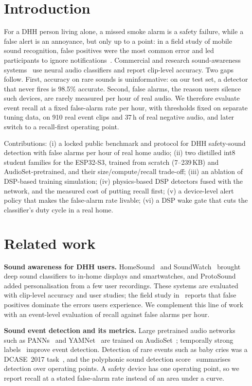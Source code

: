 \documentclass[conference]{IEEEtran}
\begin{document}
\section{Introduction}
For a DHH person living alone, a missed smoke alarm is a safety failure, while a false alert is
an annoyance, but only up to a point: in a field study of mobile sound recognition, false
positives were the most common error and led participants to ignore
notifications~\cite{notthereyet}. Commercial and research sound-awareness
systems~\cite{homesound,soundwatch,protosound} use neural audio classifiers and report
clip-level accuracy. Two gaps follow. First, accuracy on
rare sounds is uninformative: on our test set, a detector that never fires is 98.5\% accurate.
Second, false alarms, the reason users silence such devices, are rarely measured per hour of
real audio. We therefore evaluate event recall at a fixed false-alarm rate per hour, with
thresholds fixed on separate tuning data, on 910 real event clips and 37\,h of real negative
audio, and later switch to a recall-first operating point.

Contributions: (i) a locked public benchmark and protocol for DHH safety-sound detection with
false alarms per hour of real home audio; (ii) two distilled int8 student families for the
ESP32-S3, trained from scratch (7--239\,KB) and AudioSet-pretrained, and their size/compute/recall
trade-off; (iii) an ablation of DSP-based training simulation;
(iv) physics-based DSP detectors fused with the network, and the measured cost of putting recall
first; (v) a device-level alert policy that makes the false-alarm rate livable; (vi) a DSP wake
gate that cuts the classifier's duty cycle in a real home.

\section{Related work}
\textbf{Sound awareness for DHH users.} HomeSound~\cite{homesound} and SoundWatch~\cite{soundwatch}
brought deep sound classifiers to in-home displays and smartwatches, and
ProtoSound~\cite{protosound} added personalisation from a few user recordings. These systems are
evaluated with clip-level accuracy and user studies; the field study in~\cite{notthereyet} reports
that false positives dominate the errors users experience. We complement this line of work with
an event-level evaluation of recall against false alarms per hour.

\textbf{Sound event detection and its metrics.} Large pretrained audio networks such as
PANNs~\cite{panns} and YAMNet~\cite{yamnet} are trained on AudioSet~\cite{audioset}; temporally
strong labels~\cite{strong} improve event detection. Detection of rare events such as baby cries
was a DCASE~2017 task~\cite{dcase2017}, and the polyphonic sound detection score~\cite{psds}
summarises detection over operating points. A safety device has one operating point, so we
report recall at a stated false-alarm rate instead of an area under a curve.
\end{document}
